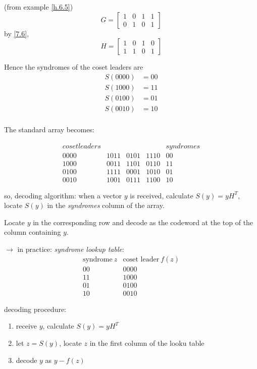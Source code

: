 \documentclass{article}
\theoremstyle{definition}
\newenvironment{eg}[1]
{\renewcommand\theinnereg{#1}\innereg}
{\endinnereg}
\begin{document}
\begin{eg}{7.10}
  (from example \ref{h.6.5})
  $$G= \begin{bmatrix}
    1 & 0 & 1 & 1\\
    0 & 1 & 0 & 1
  \end{bmatrix}$$
  by \ref{7.6},
  $$H= \begin{bmatrix}
    1 & 0 & 1 & 0\\
    1 & 1 & 0 & 1
  \end{bmatrix}$$

  Hence the syndromes of the coset leaders are
  \begin{align*}
    S(0000) &= 00\\
    S(1000) &= 11\\
    S(0100) &= 01\\
    S(0010) &= 10\\
  \end{align*}

  The standard array becomes:

  $$
  \begin{matrix}
    coset leaders & & & & syndromes\\
    0000 & 1011 & 0101 & 1110 & 00\\
    1000 & 0011 & 1101 & 0110 & 11\\
    0100 & 1111 & 0001 & 1010 & 01\\
    0010 & 1001 & 0111 & 1100 & 10
  \end{matrix}
  $$

  so, decoding algorithm: when a vector $y$ is received, calculate $S(y)=yH^T$, locate $S(y)$ in the \emph{syndromes} column of the array.

  Locate $y$ in the corresponding row and decode as the codeword at the top of the column containing $y$.


  $\longrightarrow$ in practice: \emph{syndrome lookup table}:
  $$
  \begin{matrix}
    \text{syndrome}~ z & \text{coset leader}~ f(z)\\
    00 & 0000\\
    11 & 1000\\
    01 & 0100\\
    10 & 0010
  \end{matrix}
  $$

  decoding procedure:
  \begin{enumerate}
    \item receive $y$, calculate $S(y)=y H^T$
    \item let $z=S(y)$, locate $z$ in the first column of the looku table
    \item decode $y$ as $y-f(z)$
  \end{enumerate}
\end{eg}
\end{document}
